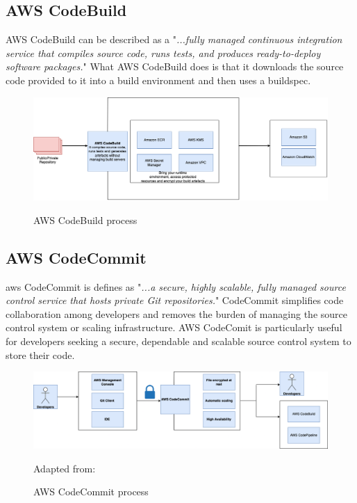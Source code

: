 \subsection{AWS CodeBuild }
AWS CodeBuild can be described as a "\textit{...fully managed continuous integration service that compiles source code, runs tests, and produces ready-to-deploy software packages.}"
\cite{AWSCodeBuild}
What AWS CodeBuild does is that it downloads the source code provided to it into a build environment and then uses a \Gls{buildspec}.\cite{AWSCodeBuild1}
\begin{figure}[htp]
    \centering
    \includegraphics[width=1\columnwidth]{Images/CodeBuild.png}
    \caption{AWS CodeBuild process}\cite{AWSCodeBuild}
    \label{fig:my_label}
\end{figure}
\newpage
\subsection{AWS CodeCommit}

\acrshort{aws} CodeCommit is defines as "\textit{...a secure, highly scalable, fully managed source control service that hosts private Git repositories.}"
\cite{AWSCodeCommit1}
CodeCommit simplifies code collaboration among developers and removes the burden of managing the source control system or scaling infrastructure. AWS CodeComit is particularly useful for developers seeking a secure, dependable and scalable source control system to store their code. \cite{AWSCodeCommit}
\begin{figure}[htp]
    \centering
    \includegraphics[width=1\columnwidth]{Images/CodeCommit.png}
    \caption{AWS CodeCommit process} Adapted from: \cite{AWSCodeCommit1}
    \label{fig:my_label}
\end{figure}

